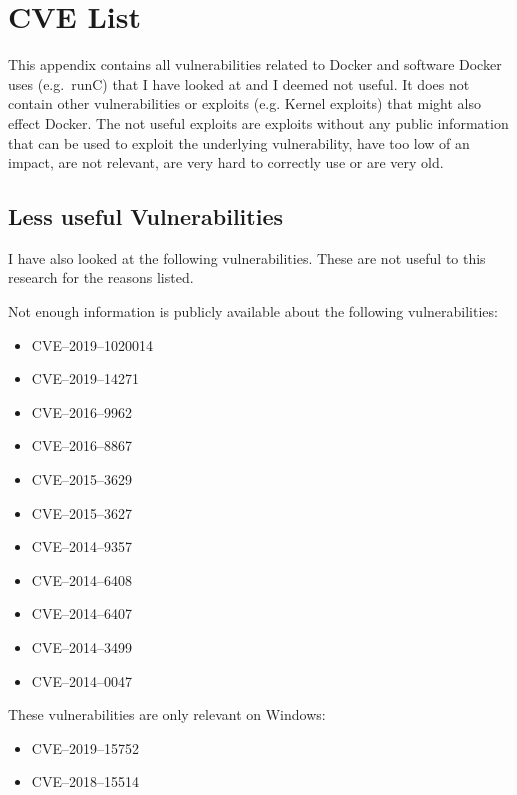 \chapter{CVE List}\label{appendix:CVE-List}

This appendix contains all vulnerabilities related to Docker and software Docker uses (e.g.\ runC) that I have looked at and I deemed not useful. It does not contain other vulnerabilities or exploits (e.g. Kernel exploits) that might also effect Docker. The not useful exploits are exploits without any public information that can be used to exploit the underlying vulnerability, have too low of an impact, are not relevant, are very hard to correctly use or are very old.

\section{Less useful Vulnerabilities}
I have also looked at the following vulnerabilities. These are not useful to this research for the reasons listed.

\hfill

Not enough information is publicly available about the following vulnerabilities:
\begin{multicols}{2}
    \begin{itemize}
        \item CVE--2019--1020014
        \item CVE--2019--14271
        \item CVE--2016--9962
        \item CVE--2016--8867
        \item CVE--2015--3629
        \item CVE--2015--3627
        \item CVE--2014--9357
        \item CVE--2014--6408
        \item CVE--2014--6407
        \item CVE--2014--3499
        \item CVE--2014--0047
    \end{itemize}
\end{multicols}

\hfill

These vulnerabilities are only relevant on Windows:
\begin{itemize}
    \item CVE--2019--15752
    \item CVE--2018--15514
\end{itemize}

